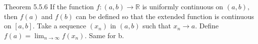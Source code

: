 \documentclass[10pt,landscape]{article}
\makeatletter
\renewcommand{\section}{\@startsection{section}{1}{0mm}%
                                {-1ex plus -.5ex minus -.2ex}%
                                {0.5ex plus .2ex}%
                                {\normalfont\large\bfseries}}
\theoremstyle{definition}
\newcommand{\thistheoremname}{}
\newtheorem*{genericthm*}{\thistheoremname}
\newenvironment{namedthm*}[1]
{\renewcommand{\thistheoremname}{#1}\begin{genericthm*}}
{\end{genericthm*}}
\makeatother
\begin{document}
\begin{multicols}{3}
	\begin{namedthm*}{Theorem 5.5.6}
		If the function \(f:(a, b) \rightarrow \mathbb{R}\) is uniformly continuous on \((a, b),\) then \(f(a)\) and \(f(b)\)
		can be defined so that the extended function is continuous on \([a, b] .\) Take a sequence \(\left(x_{n}\right)\) in \((a, b)\) such that \(x_{n} \rightarrow a\). Define \(f(a)=\lim _{n \rightarrow \infty} f\left(x_{n}\right)\). Same for b.
	\end{namedthm*}


\end{multicols}
\end{document}
